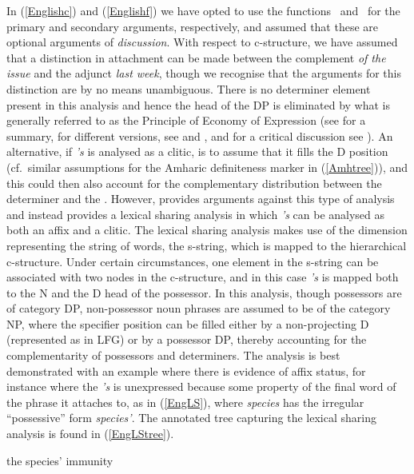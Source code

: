 \documentclass[output=paper,hidelinks]{langscibook}
\begin{document}
In (\ref{Englishc}) and (\ref{Englishf}) we have opted to use the functions \POSS\ and \OBLTHETA\ for the primary and secondary arguments, respectively, and assumed that these are optional arguments of \emph{discussion}. With respect to c-structure, we have assumed that a distinction in attachment can be made between the complement \emph{of the issue} and the adjunct \emph{last week}, though we recognise that the arguments for this distinction are by no means unambiguous. There is no determiner element present in this analysis and hence the head of the DP is eliminated by what is generally referred to as the Principle of Economy of Expression (see  for a summary, for different versions, see \citealt[90--2]{BresnanEtAl2016} and \citealt{Toivonen:NonProj}, and for a critical discussion see \citet{Dalrympleetal2015}). An alternative, if \emph{'s} is analysed as a clitic, is to assume that it fills the D position (cf.\ similar assumptions for the Amharic definiteness marker in (\ref{Amhtree})), and this could then also account for the complementary distribution between the determiner and the {\POSS}. However, \citet{lowe2015clitic} provides arguments against this type of analysis and instead provides a lexical sharing analysis in which \emph{'s} can be analysed as both an affix and a clitic. The lexical sharing analysis makes use of the dimension representing the string of words, the s-string, which is mapped to the hierarchical c-structure. Under certain circumstances, one element in the s-string can be associated with two nodes in the c-structure, and in this case \emph{'s} is mapped both to the N and the D head of the possessor. In this analysis, though possessors are of category DP, non-possessor noun phrases are assumed to be of the category NP, where the specifier position can be filled either by a non-projecting D (represented as  in LFG)
or by a possessor DP, thereby accounting for the complementarity of possessors and determiners. The analysis is best demonstrated with an example where there is evidence of affix status, for instance where the \emph{'s} is unexpressed because some property of the final word of the phrase it attaches to, as in (\ref{EngLS}), where \emph{species} has the irregular ``possessive'' form \emph{species'}. The annotated tree capturing the lexical sharing analysis is found in (\ref{EngLStree}).

\newpage
\ea\label{EngLS}
the species' immunity
\z
\end{document}
